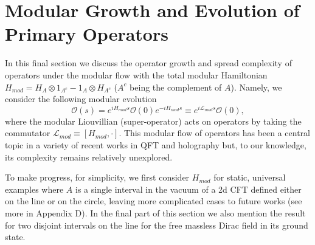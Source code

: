 \documentclass[aps,prl,twocolumn,showpacs,preprintnumbers,amsmath,amssymb]{revtex4-1}
\def\be{\begin{equation}}
\def\ee{\end{equation}}
\begin{document}
\section*{Modular Growth and Evolution of Primary Operators}
In this final section we discuss the operator growth and spread complexity of operators under the modular flow with the total modular Hamiltonian $H_{mod}=H_A\otimes 1_{A^c}-1_{A}\otimes H_{A^c}$ ($A^c$ being the complement of $A$). Namely, we consider the following modular evolution \cite{Haag,Takesaki:1970aki,Borchers:2000pv}
\be
\mathcal{O}(s)=e^{iH_{mod}s}\mathcal{O}(0)e^{-iH_{mod}s}\equiv e^{i\mathcal{L}_{mod}s}\mathcal{O}(0),\label{ModEvOp}
\ee
where the modular Liouvillian (super-operator) acts on operators by taking the commutator $\mathcal{L}_{mod}\equiv [H_{mod},\cdot]$. This modular flow of operators has been a central topic in a variety of recent works in QFT and holography \cite{Hislop:1981uh,Casini:2009vk,Jafferis:2014lza,Jafferis:2015del,Faulkner:2017vdd,DeBoer:2019kdj,Mintchev:2022fcp,Lashkari:2018nsl,Leutheusser:2021frk,Casini:2011kv,Wong:2013gua,Cardy:2016fqc,Longo:2009mn,Hollands:2019hje} but, to our knowledge, its complexity remains relatively unexplored. 

To make progress, for simplicity, we first consider $H_{mod}$ for static, universal examples where $A$ is a single interval in the vacuum of a 2d CFT defined either on the line or on the circle, leaving more complicated cases to future works (see more in Appendix D). In the final part of this section we also mention the result for two disjoint intervals on the line for the free massless Dirac field in its ground state.
\end{document}

